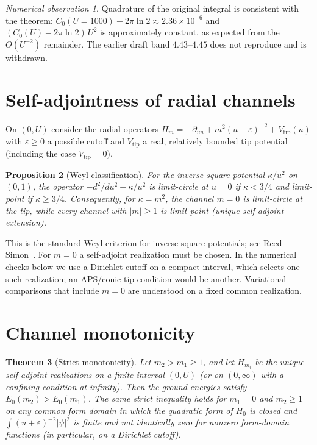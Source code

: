 \documentclass[11pt,a4paper]{article}
\newtheorem{theorem}{Theorem}
\newtheorem{proposition}[theorem]{Proposition}
\theoremstyle{definition}
\theoremstyle{remark}
\newtheorem{numobs}[theorem]{Numerical observation}
\begin{document}
\begin{numobs}
Quadrature of the original integral is consistent with the theorem:
$C_0(U=1000)-2\pi\ln 2\approx 2.36\times 10^{-6}$ and
$(C_0(U)-2\pi\ln 2)\,U^2$ is approximately constant, as expected from the
$O(U^{-2})$ remainder. The earlier draft band $4.43$--$4.45$ does not
reproduce and is withdrawn.
\end{numobs}

\section{Self-adjointness of radial channels}

On $(0,U)$ consider the radial operators
$H_m=-\partial_{uu}+m^2(u+\varepsilon)^{-2}+V_{\mathrm{tip}}(u)$
with $\varepsilon\ge 0$ a possible cutoff and $V_{\mathrm{tip}}$ a
real, relatively bounded tip potential (including the case $V_{\mathrm{tip}}=0$).

\begin{proposition}[Weyl classification]
\label{prop:weyl}
For the inverse-square potential $\kappa/u^2$ on $(0,1)$, the operator
$-d^2/du^2+\kappa/u^2$ is limit-circle at $u=0$ if $\kappa<3/4$ and
limit-point if $\kappa\ge 3/4$. Consequently, for $\kappa=m^2$, the
channel $m=0$ is limit-circle at the tip, while every channel with
$|m|\ge 1$ is limit-point (unique self-adjoint extension).
\end{proposition}

This is the standard Weyl criterion for inverse-square potentials; see
Reed--Simon~\cite{ReedSimon}. For $m=0$ a self-adjoint realization must
be chosen. In the numerical checks below we use a Dirichlet cutoff on a
compact interval, which selects one such realization; an APS/conic tip
condition would be another. Variational comparisons that include $m=0$
are understood on a fixed common realization.

\section{Channel monotonicity}

\begin{theorem}[Strict monotonicity]
\label{thm:mono}
Let $m_2>m_1\ge 1$, and let $H_{m_i}$ be the unique self-adjoint
realizations on a finite interval $(0,U)$ (or on $(0,\infty)$ with a
confining condition at infinity). Then the ground energies satisfy
$E_0(m_2)>E_0(m_1)$. The same strict inequality holds for $m_1=0$ and
$m_2\ge 1$ on any common form domain in which the quadratic form of
$H_0$ is closed and $\int(u+\varepsilon)^{-2}|\psi|^2$ is finite and
not identically zero for nonzero form-domain functions (in particular,
on a Dirichlet cutoff).
\end{theorem}
\end{document}
